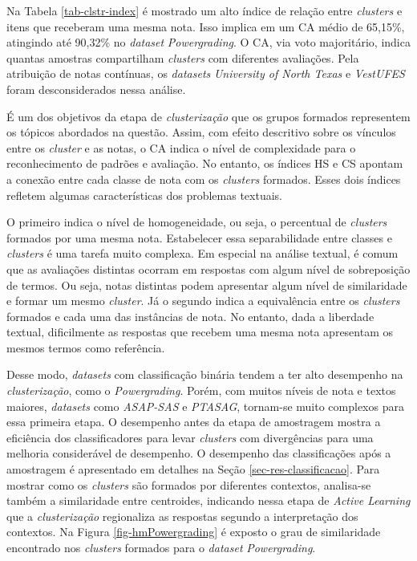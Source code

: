 Na Tabela \ref{tab-clstr-index} é mostrado um alto índice de relação entre \textit{clusters} e itens que receberam uma mesma nota. Isso implica em um CA médio de 65,15\%, atingindo até 90,32\% no \textit{dataset} \textit{Powergrading}. O CA, via voto majoritário, indica quantas amostras compartilham \textit{clusters} com diferentes avaliações. Pela atribuição de notas contínuas, os \textit{datasets} \textit{University of North Texas} e \textit{VestUFES} foram desconsiderados nessa análise.

É um dos objetivos da etapa de \textit{clusterização} que os grupos formados representem os tópicos abordados na questão. Assim, com efeito descritivo sobre os vínculos entre os \textit{cluster} e as notas, o CA indica o nível de complexidade para o reconhecimento de padrões e avaliação. No entanto, os índices HS e CS apontam a conexão entre cada classe de nota com os \textit{clusters} formados. Esses dois índices refletem algumas características dos problemas textuais.

O primeiro indica o nível de homogeneidade, ou seja, o percentual de \textit{clusters} formados por uma mesma nota. Estabelecer essa separabilidade entre classes e \textit{clusters} é uma tarefa muito complexa. Em especial na análise textual, é comum que as avaliações distintas ocorram em respostas com algum nível de sobreposição de termos. Ou seja, notas distintas podem apresentar algum nível de similaridade e formar um mesmo \textit{cluster}. Já o segundo indica a equivalência entre os \textit{clusters} formados e cada uma das instâncias de nota. No entanto, dada a liberdade textual, dificilmente as respostas que recebem uma mesma nota apresentam os mesmos termos como referência.

Desse modo, \textit{datasets} com classificação binária tendem a ter alto desempenho na \textit{clusterização}, como o \textit{Powergrading}. Porém, com muitos níveis de nota e textos maiores, \textit{datasets} como \textit{ASAP-SAS} e \textit{PTASAG}, tornam-se muito complexos para essa primeira etapa. O desempenho antes da etapa de amostragem mostra a eficiência dos classificadores para levar \textit{clusters} com divergências para uma melhoria considerável de desempenho. O desempenho das classificações após a amostragem é apresentado em detalhes na Seção \ref{sec-res-classificacao}. Para mostrar como os \textit{clusters} são formados por diferentes contextos, analisa-se também a similaridade entre centroides, indicando nessa etapa de \textit{Active Learning} que a \textit{clusterização} regionaliza as respostas segundo a interpretação dos contextos. Na Figura \ref{fig-hmPowergrading} é exposto o grau de similaridade encontrado nos \textit{clusters} formados para o \textit{dataset} \textit{Powergrading}.

